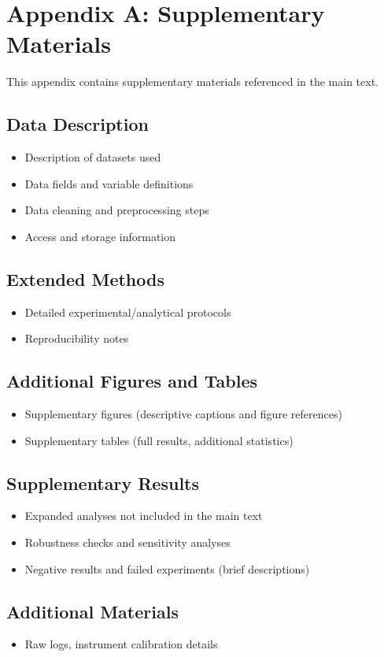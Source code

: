 \chapter{Appendix A: Supplementary Materials}

This appendix contains supplementary materials referenced in the main text.

\section{Data Description}
\begin{itemize}
  \item Description of datasets used 
  \item Data fields and variable definitions
  \item Data cleaning and preprocessing steps
  \item Access and storage information 
\end{itemize}

\section{Extended Methods}
\begin{itemize}
  \item Detailed experimental/analytical protocols
  \item Reproducibility notes
\end{itemize}

\section{Additional Figures and Tables}
\begin{itemize}
  \item Supplementary figures (descriptive captions and figure references)
  \item Supplementary tables (full results, additional statistics)
\end{itemize}

\section{Supplementary Results}

\begin{itemize}
  \item Expanded analyses not included in the main text
  \item Robustness checks and sensitivity analyses
  \item Negative results and failed experiments (brief descriptions)
\end{itemize}

\section{Additional Materials}
\begin{itemize}
  \item Raw logs, instrument calibration details
\end{itemize}